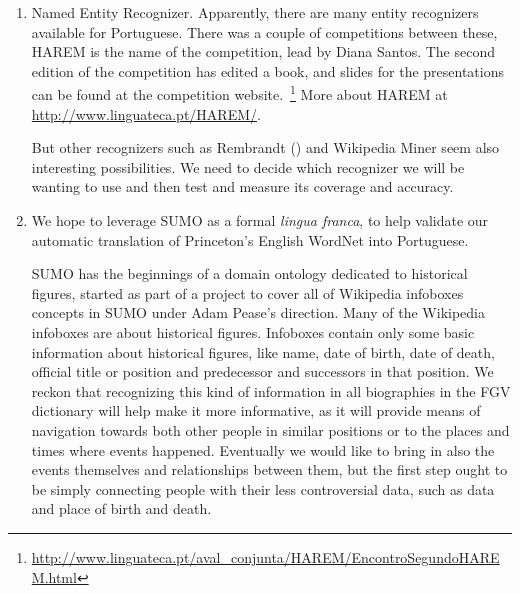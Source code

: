 \begin{enumerate}
  Also we plan to partner with the group of Prof. Leonel Alencar from
  the Universidade Federal do Cear\'a to work on the more syntactical
  aspects of our project and they apparently are planning a different
  version of a Portuguese VerbNet. If this turns out to be the case,
  we hope to be able to use it in our research.
 
\item Named Entity Recognizer. Apparently, there are many entity
  recognizers available for Portuguese. There was a couple of
  competitions between these, HAREM is the name of the competition,
  lead by Diana Santos. The second edition of the competition has
  edited a book, and slides for the presentations can be found at the
  competition
  website.~\footnote{\url{http://www.linguateca.pt/aval_conjunta/HAREM/EncontroSegundoHAREM.html}}
  More about HAREM at \url{http://www.linguateca.pt/HAREM/}.
  
  But other recognizers such as Rembrandt \cite{}(\url{}) and
  Wikipedia Miner seem also interesting possibilities. We need to
  decide which recognizer we will be wanting to use and then test and
  measure its coverage and accuracy.
 
\item 
  We hope to leverage SUMO as a formal {\em lingua franca}, to help
  validate our automatic translation of Princeton's English WordNet
  into Portuguese.

  SUMO has the beginnings of a domain ontology dedicated to historical
  figures, started as part of a project to cover all of Wikipedia
  infoboxes concepts in SUMO under Adam Pease's direction. Many of the
  Wikipedia infoboxes are about historical figures. Infoboxes contain
  only some basic information about historical figures, like name,
  date of birth, date of death, official title or position and
  predecessor and successors in that position. We reckon that
  recognizing this kind of information in all biographies in the FGV
  dictionary will help make it more informative, as it will provide
  means of navigation towards both other people in similar positions
  or to the places and times where events happened. Eventually we
  would like to bring in also the events themselves and relationships
  between them, but the first step ought to be simply connecting
  people with their less controversial data, such as data and place of
  birth and death.


\end{enumerate}
